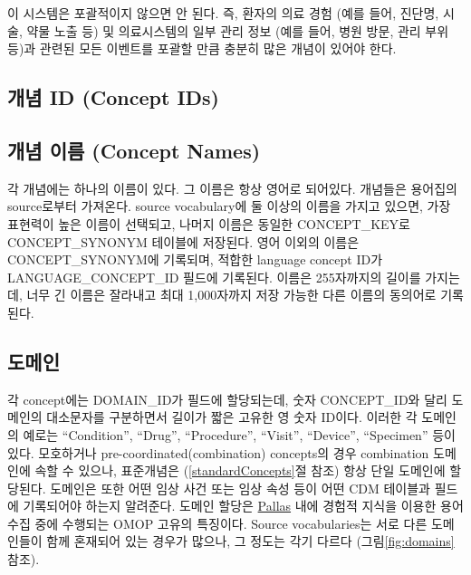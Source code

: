 \documentclass[11pt]{book}
\theoremstyle{definition}
\theoremstyle{definition}
\theoremstyle{definition}
\theoremstyle{remark}
\begin{document}
이 시스템은 포괄적이지 않으면 안 된다. 즉, 환자의 의료 경험 (예를 들어,
진단명, 시술, 약물 노출 등) 및 의료시스템의 일부 관리 정보 (예를 들어,
병원 방문, 관리 부위 등)과 관련된 모든 이벤트를 포괄할 만큼 충분히 많은
개념이 있어야 한다.

\subsection{개념 ID (Concept IDs)}\label{-id-concept-ids}

\subsection{개념 이름 (Concept Names)}\label{--concept-names}

각 개념에는 하나의 이름이 있다. 그 이름은 항상 영어로 되어있다. 개념들은
용어집의 source로부터 가져온다. source vocabulary에 둘 이상의 이름을
가지고 있으면, 가장 표현력이 높은 이름이 선택되고, 나머지 이름은 동일한
CONCEPT\_KEY로 CONCEPT\_SYNONYM 테이블에 저장된다. 영어 이외의 이름은
CONCEPT\_SYNONYM에 기록되며, 적합한 language concept ID가
LANGUAGE\_CONCEPT\_ID 필드에 기록된다. 이름은 255자까지의 길이를
가지는데, 너무 긴 이름은 잘라내고 최대 1,000자까지 저장 가능한 다른
이름의 동의어로 기록된다.

\subsection{도메인}\label{conceptDomains}

각 concept에는 DOMAIN\_ID가 필드에 할당되는데, 숫자 CONCEPT\_ID와 달리
도메인의 대소문자를 구분하면서 길이가 짧은 고유한 영 숫자 ID이다. 이러한
각 도메인의 예로는 ``Condition'', ``Drug'', ``Procedure'', ``Visit'',
``Device'', ``Specimen'' 등이 있다. 모호하거나
pre-coordinated(combination) concepts의 경우 combination 도메인에 속할
수 있으나, 표준개념은 (\ref{standardConcepts}절 참조) 항상 단일 도메인에
할당된다. 도메인은 또한 어떤 임상 사건 또는 임상 속성 등이 어떤 CDM
테이블과 필드에 기록되어야 하는지 알려준다. 도메인 할당은
\href{https://github.com/ohDSI/vocabulary-v5.0}{Pallas} 내에 경험적
지식을 이용한 용어 수집 중에 수행되는 OMOP 고유의 특징이다. Source
vocabularies는 서로 다른 도메인들이 함께 혼재되어 있는 경우가 많으나, 그
정도는 각기 다르다 (그림\ref{fig:domains} 참조). 
\end{document}
